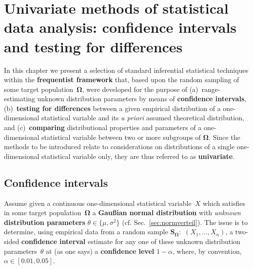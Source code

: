 \chapter[Univariate methods of statistical data
analysis]{Univariate methods of statistical data analysis: 
confidence intervals and testing for differences}
In this chapter we present a selection of standard inferential 
statistical techniques within the \textbf{frequentist framework}
that, based upon the random sampling of some target 
population~$\boldsymbol{\Omega}$, were developed for the purpose 
of (a)~range-estimating unknown distribution parameters by means 
of \textbf{confidence intervals}, (b)~\textbf{testing for
differences} between a given empirical distribution of a
one-dimensional statistical variable and its \textit{a priori}
assumed theoretical distribution, and (c)~\textbf{comparing}
distributional properties and parameters of a one-dimensional
statistical variable between two or more subgroups of
$\boldsymbol{\Omega}$. Since the methods to be introduced relate to considerations on distributions of a single one-dimensional
statistical variable only, they are thus referred to as
\textbf{univariate}.

\section[Confidence intervals]{Confidence intervals}
Assume given a continuous one-dimensional statistical variable~$X$ 
which satisfies in some target population~$\boldsymbol{\Omega}$ a 
\textbf{Gau\ss ian normal distribution} with \textit{unknown}
\textbf{distribution parameters} $\theta \in \{\mu, \sigma^{2}\}$
(cf. Sec.~\ref{sec:normverteil}). The issue is to determine, using 
empirical data from a random sample 
$\boldsymbol{S_{\Omega}}$:~$(X_{1}, \ldots, X_{n})$, a two-sided 
 \textbf{confidence interval} estimate for any one of these unknown distribution parameters~$\theta$
at (as one says) a \textbf{confidence level} $1-\alpha$, where, by
convention, $\alpha \in [0.01,0.05]$.

